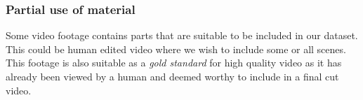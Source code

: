 \subsubsection{Partial use of material}
%
Some video footage contains parts that are suitable to be included in our dataset. This could be human edited video where we wish to include some or all scenes. This footage is also suitable as a \textit{gold standard} for high quality video as it has already been viewed by a human and deemed worthy to include in a final cut video.
%
